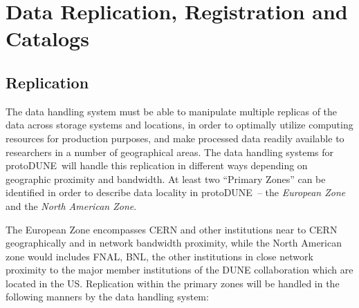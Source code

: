 \documentclass[pdftex,12pt,letter]{article}
\newcommand{\pd}{protoDUNE\ }
\begin{document}
\section{Data Replication, Registration and Catalogs}
\subsection{Replication}
\label{sec:replication}
The data handling system must be able to manipulate multiple replicas of the data across storage systems and locations, in order
to optimally utilize computing resources for production purposes, and make processed data readily available to researchers in
a number of geographical areas.
The data handling systems for \pd will handle this replication in different ways
depending on geographic proximity and bandwidth.  At least two ``Primary Zones'' can be identified in order
to describe data locality in \pd -- the \textit{European Zone} and the \textit{North American Zone}.

The European Zone encompasses CERN and other institutions near to CERN geographically and in network bandwidth proximity,
while the North American zone would includes  FNAL, BNL, the other institutions
in close network proximity to the major member institutions of the DUNE collaboration which are located in the US.
Replication within the primary zones will be handled in the following manners by the data handling system:
\end{document}
